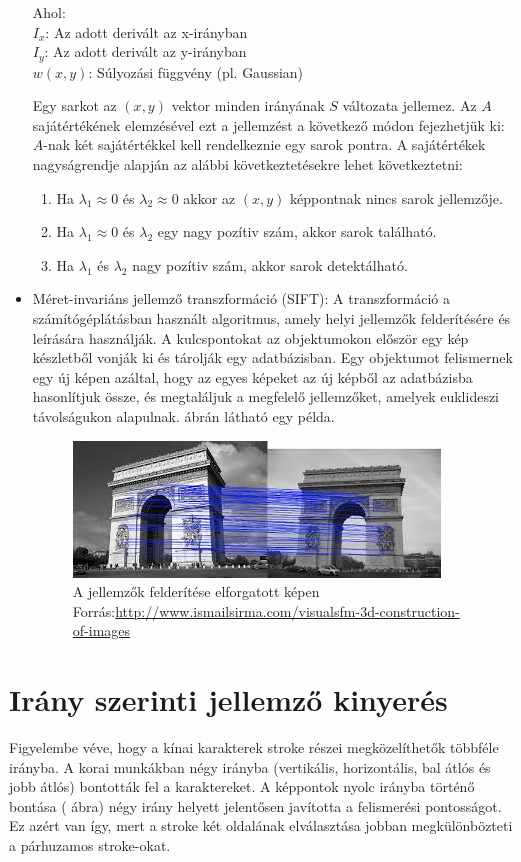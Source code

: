 \begin{itemize}
Ahol:\\
$I_x$: Az adott derivált az x-irányban\\
$I_y$: Az adott derivált az y-irányban\\
$w(x, y)$: Súlyozási függvény (pl. Gaussian)

Egy sarkot az $(x, y)$ vektor minden irányának $S$ változata jellemez. Az $A$ sajátértékének elemzésével ezt a jellemzést a következő módon fejezhetjük ki: $A$-nak két sajátértékkel kell rendelkeznie egy sarok pontra. A sajátértékek nagyságrendje alapján az alábbi következtetésekre lehet következtetni:
\begin{enumerate}
\item Ha $\lambda _{1}\approx 0$ és $\lambda_2 \approx 0$ akkor az $(x,y)$ képpontnak nincs sarok jellemzője.
\item Ha $\lambda_1 \approx 0$ és $\lambda _{2}$ egy nagy pozítiv szám, akkor sarok található.
\item Ha $\lambda_1$ és $\lambda_2$ nagy pozítiv szám, akkor sarok detektálható.
\end{enumerate}
\item Méret-invariáns jellemző transzformáció (SIFT): A transzformáció a számítógéplátásban használt algoritmus, amely helyi jellemzők felderítésére és leírására használják. A kulcspontokat az objektumokon először egy kép készletből vonják ki és tárolják egy adatbázisban. Egy objektumot felismernek egy új képen azáltal, hogy az egyes képeket az új képből az adatbázisba hasonlítjuk össze, és megtaláljuk a megfelelő jellemzőket, amelyek euklideszi távolságukon alapulnak.  ábrán látható egy példa.
\begin{figure}[h]
\centering
\captionsetup{justification=centering}
\includegraphics[scale=1.0]{images/sift}
\caption{A jellemzők felderítése elforgatott képen \hspace{\textwidth}Forrás:\url{http://www.ismailsirma.com/visualsfm-3d-construction-of-images}}
\label{fig:sift}
\end{figure}
\end{itemize}

\section{Irány szerinti jellemző kinyerés}
Figyelembe véve, hogy a kínai karakterek stroke részei megközelíthetők többféle irányba. A korai munkákban négy irányba (vertikális, horizontális, bal átlós és jobb átlós) bontották fel a karaktereket. A képpontok nyolc irányba történő bontása ( ábra) négy irány helyett jelentősen javította a felismerési pontosságot. Ez azért van így, mert a stroke két oldalának elválasztása jobban megkülönbözteti a párhuzamos stroke-okat.

